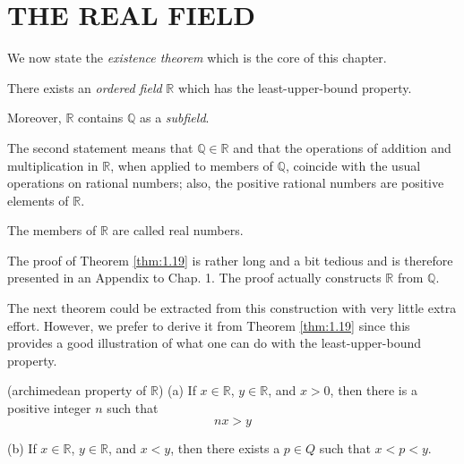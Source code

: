 
\section{THE REAL FIELD}

We now state the \emph{existence theorem} which is the core of this chapter.

\begin{thm}\label{thm:1.19}
There exists an \emph{ordered field} $\mathbb{R}$ which has the least-upper-bound
property.

Moreover, $\mathbb{R}$ contains $\mathbb{Q}$ as a \emph{subfield}.
\end{thm}

The second statement means that $\mathbb{Q} \in \mathbb{R}$ and that the operations of
addition and multiplication in $\mathbb{R}$, when applied to members of $\mathbb{Q}$, coincide with
the usual operations on rational numbers; also, the positive rational numbers
are positive elements of $\mathbb{R}$.

The members of $\mathbb{R}$ are called real numbers.

The proof of Theorem \ref{thm:1.19} is rather long and a bit tedious and is therefore
presented in an Appendix to Chap. 1. The proof actually constructs $\mathbb{R}$ from $\mathbb{Q}$.

The next theorem could be extracted from this construction with very
little extra effort. However, we prefer to derive it from Theorem \ref{thm:1.19} since this
provides a good illustration of what one can do with the least-upper-bound
property.


\begin{thm}\label{thm:1.20}(archimedean property of $\mathbb{R}$)
    (a) If $x \in \mathbb{R}$, $y \in \mathbb{R}$, and $x > 0$, then there is a positive integer $n$ such that
    \begin{equation*}
        nx > y
    \end{equation*}

    (b) If $x \in \mathbb{R}$, $y \in \mathbb{R}$, and $x < y$, then there exists a $p \in Q$ such that $x < p < y$.
\end{thm}

